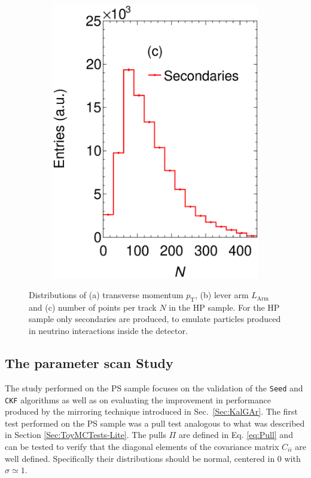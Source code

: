 \begin{figure}[!ht]
\begin{subfigure}[b]{0.32\textwidth}
         \includegraphics[width=\textwidth]{figures/ch5-KF_NDGAr/ToySample/testNDGArMirrorNAllTall.eps}
         \caption{}
         \label{fig:NGAr}
     \end{subfigure}
        \caption{Distributions of (a) transverse momentum $p_{\textrm{T}}$,  (b) lever arm $L_{\textrm{Arm}}$ and (c) number of points per track $N$ in the HP sample. For the HP sample only secondaries are produced, to emulate particles produced in neutrino interactions inside the detector. } \label{fig:GArProperties}
\end{figure}


\subsection{The parameter scan Study}
\label{Sec:ParScan}
The study performed on the PS sample focuses on the validation of the \texttt{Seed} and \texttt{CKF} algorithms as well as on evaluating the improvement in performance produced by the mirroring technique introduced in Sec.~\ref{Sec:KalGAr}. The first test performed on the PS sample was a pull test analogous to what was described in Section \ref{Sec:ToyMCTests-Lite}. The pulls $\Pi$ are defined in Eq. \ref{eq:Pull} and can be tested to verify that the diagonal elements of the covariance matrix $C_{ii}$ are well defined. Specifically their distributions should be normal, centered in 0  with $\sigma\simeq1$.

